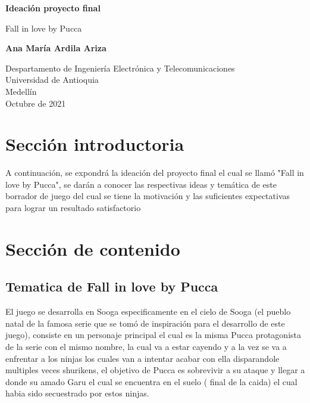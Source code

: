 \documentclass{article}
\begin{document}
\begin{titlepage}
    \begin{center}
        \vspace*{1cm}
            
        \Huge
        \textbf{Ideación proyecto final}
            
        \vspace{0.5cm}
        \LARGE
        Fall in love by Pucca
            
        \vspace{1.5cm}
            
        \textbf{Ana María Ardila Ariza}
            
        \vfill
            
        \vspace{0.8cm}
            
        \Large
        Despartamento de Ingeniería Electrónica y Telecomunicaciones\\
        Universidad de Antioquia\\
        Medellín\\
        Octubre de 2021
            
    \end{center}
\end{titlepage}

\tableofcontents
\newpage
\section{Sección introductoria}\label{intro}
A continuación, se expondrá la ideación del proyecto final el cual se llamó "Fall in love by Pucca", se darán a conocer las respectivas ideas y temática de este borrador de juego del cual se tiene la motivación y las suficientes expectativas para lograr un resultado satisfactorio

\section{Sección de contenido} \label{contenido}
\subsection{Tematica de Fall in love by Pucca}
El juego se desarrolla en Sooga especificamente en el cielo de Sooga (el pueblo natal de la famosa serie que se tomó de inspiración para el desarrollo de este juego), consiste en un personaje principal el cual es la misma Pucca protagonista de la serie con el mismo nombre, la cual va a estar cayendo y a la vez se va a enfrentar a los ninjas los cuales van a intentar acabar con ella disparandole multiples veces shurikens, el objetivo de Pucca es sobrevivir a su ataque y llegar a donde su amado Garu el cual se encuentra en el suelo ( final de la caida) el cual habia sido secuestrado por estos ninjas.
\end{document}
